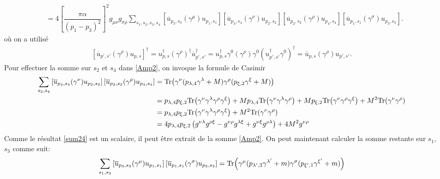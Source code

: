 {\begin{alphaparts}
\begin{align}
        &= 4\left[\dfrac{\pi \alpha }{(p_1 - p_3)^2}\right]^2 g_{\mu \nu} g_{\sigma \rho} \sum_{s_1, s_2, s_3, s_4}\left[\overline{u}_{p_3, s_3} (\gamma^\mu) u_{p_1, s_1}\right]  \left[ \overline{u}_{p_4, s_4} (\gamma^\nu) u_{p_2, s_2} \right]  \left[ \overline{u}_{p_2, s_2} (\gamma^\rho) u_{p_{4}, s_{4}} \right] \left[\overline{u}_{p_1, s_1} (\gamma^\sigma) u_{p_{3}, s_{3}}\right]. \label{Amp2}
    \end{align} 
    où on a utilisé
    \begin{align}
        \left[  \overline{u}_{p', s'} (\gamma^\rho) u_{p, s} \right]^\dagger =   u_{p, s}^\dagger (\gamma^\rho)^\dagger \overline{u}_{p', s'}^\dagger  =  u_{p, s}^\dagger \gamma^0 (\gamma^\rho) \gamma^0  (u_{p', s'}^\dagger\gamma^0)^\dagger  = \bar{u}_{p, s} (\gamma^\rho)  u_{p', s'}.
    \end{align}
    Pour effectuer la somme sur $s_2$ et $s_{4}$ dans \eqref{Amp2}, on invoque la formule de Casimir 
    \begin{align}
        \sum_{s_2, s_{4}}  \left[ \overline{u}_{p_4, s_4} (\gamma^\nu) u_{p_2, s_2} \right]  \left[ \overline{u}_{p_2, s_2} (\gamma^\rho) u_{p_{4}, s_{4}} \right] &= \text{Tr}\qty(\gamma^\nu(p_{\lambda, 4} \gamma^\lambda + M) \gamma^\rho (p_{\xi, 2} \gamma^\xi + M))\nonumber\\
        &=  p_{\lambda, 4}p_{\xi, 2} \text{Tr}\qty(\gamma^\nu\gamma^\lambda \gamma^\rho \gamma^\xi) + M p_{\lambda, 4} \text{Tr}\qty(\gamma^\nu \gamma^\lambda \gamma^\rho) + M p_{\xi, 2} \text{Tr}\qty(\gamma^\nu \gamma^\rho \gamma^\xi) + M^2 \text{Tr}\qty(\gamma^\nu \gamma^\rho) \nonumber\\
        &= p_{\lambda, 4}p_{\xi, 2} \text{Tr}\qty(\gamma^\nu\gamma^\lambda \gamma^\rho \gamma^\xi) + M^2 \text{Tr}\qty(\gamma^\nu \gamma^\rho) \nonumber\\
        &= 4 p_{\lambda, 4}p_{\xi, 2} \left(g^{\nu \lambda} g^{\rho \xi}-g^{\nu \rho} g^{\lambda \xi}+g^{\nu \xi} g^{\rho \lambda}\right) + 4 M^2 g^{\nu \rho}\label{sum24}
    \end{align}
    Comme le résultat \eqref{sum24} est un scalaire, il peut être extrait de la somme \eqref{Amp2}. On peut maintenant calculer la somme restante sur $s_1$, $s_3$ comme suit:
    \begin{align}
        \sum_{s_1, s_{3}}  \left[ \overline{u}_{p_3, s_3} (\gamma^\mu) u_{p_1, s_1} \right]  \left[ \overline{u}_{p_1, s_1} (\gamma^\sigma) u_{p_{3}, s_{3}} \right] &= \text{Tr}\qty(\gamma^\mu(p_{\lambda', 3} \gamma^{\lambda'} + m) \gamma^\sigma (p_{\xi', 1} \gamma^{\xi'} + m))\nonumber\\

\end{align}
\end{alphaparts}}
